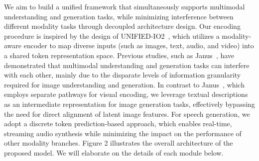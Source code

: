 We aim to build a unified framework that simultaneously supports multimodal understanding and generation tasks, while minimizing interference between different modality tasks through decoupled architecture design. Our encoding procedure is inspired by the design of UNIFIED-IO2~\cite{unified_io2}, which utilizes a modality-aware encoder to map diverse inputs (such as images, text, audio, and video) into a shared token representation space. Previous studies, such as Janus~\cite{Janus}, have demonstrated that multimodal understanding and generation tasks can interfere with each other, mainly due to the disparate levels of information granularity required for image understanding and generation.  In contrast to Janus~\cite{Janus}, which employs separate pathways for visual encoding, we leverage textual descriptions as an intermediate representation for image generation tasks, effectively bypassing the need for direct alignment of latent image features. For speech generation, we adopt a discrete token prediction-based approach, which enables real-time, streaming audio synthesis while minimizing the impact on the performance of other modality branches. Figure 2 illustrates the overall architecture of the proposed model. We will elaborate on the details of each module below.







